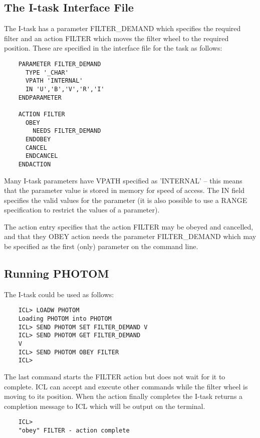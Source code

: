 \documentclass[twoside,11pt]{report}
\newcommand{\xlabel}[1]{}
\begin{document}
\subsection{\xlabel{the_itask_interface_file}The I-task Interface File}

The I-task has a parameter FILTER\_DEMAND which specifies the required filter
and an action FILTER which moves the filter wheel to the required position.
These are specified in the interface file for the task as follows:

\begin{verbatim}
    PARAMETER FILTER_DEMAND
      TYPE '_CHAR'
      VPATH 'INTERNAL'
      IN 'U','B','V','R','I'
    ENDPARAMETER

    ACTION FILTER
      OBEY
        NEEDS FILTER_DEMAND
      ENDOBEY
      CANCEL
      ENDCANCEL
    ENDACTION
\end{verbatim}

Many I-task parameters have VPATH specified as 'INTERNAL' --
this means that the parameter value is stored in memory for speed of access.
The IN field
specifies the valid values for the parameter (it is also possible to use
a RANGE specification to restrict the values of a parameter).

The action entry specifies that the action FILTER may be obeyed and
cancelled, and that they OBEY action needs the parameter FILTER\_DEMAND which
may be specified as the first (only) parameter on the command line.

                                      
\subsection{\xlabel{running_photom}Running PHOTOM}

The I-task could be used as follows:

\begin{verbatim}
    ICL> LOADW PHOTOM
    Loading PHOTOM into PHOTOM
    ICL> SEND PHOTOM SET FILTER_DEMAND V
    ICL> SEND PHOTOM GET FILTER_DEMAND
    V
    ICL> SEND PHOTOM OBEY FILTER
    ICL>
\end{verbatim}

The last command starts the FILTER action but does not wait for it to complete.
ICL can accept and execute other commands while the filter wheel is moving
to its position. When the action finally completes the I-task returns a
completion message to ICL which will be output on the terminal.

\begin{verbatim}
    ICL>
    "obey" FILTER - action complete
\end{verbatim}
                               
\end{document}
